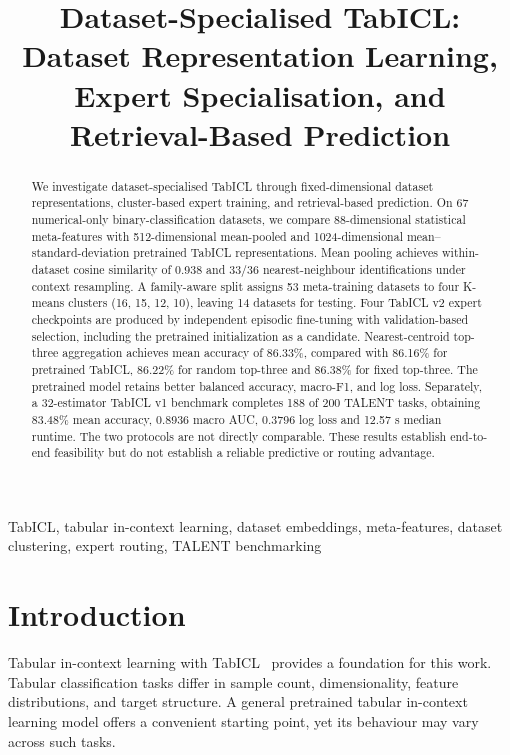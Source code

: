 \documentclass[conference]{IEEEtran}
\title{Dataset-Specialised TabICL: Dataset Representation Learning, Expert Specialisation, and Retrieval-Based Prediction}
\author{
\IEEEauthorblockN{
Ayinala Sri Nikesh (240041005)\\
Geddada Mahidhar (240041017)\\
Kesavarapu Deepak Reddy (240041022)
}
\IEEEauthorblockA{
MA 305 -- Data Science Project\\
End Evaluation -- Team 7\\
\url{https://github.com/Mahidhar21/Dataset-Specialised-TabICL}
}
}
\begin{document}
\maketitle

\begin{abstract}
We investigate dataset-specialised TabICL through fixed-dimensional dataset representations, cluster-based expert training, and retrieval-based prediction. On 67 numerical-only binary-classification datasets, we compare 88-dimensional statistical meta-features with 512-dimensional mean-pooled and 1024-dimensional mean--standard-deviation pretrained TabICL representations. Mean pooling achieves within-dataset cosine similarity of 0.938 and 33/36 nearest-neighbour identifications under context resampling. A family-aware split assigns 53 meta-training datasets to four K-means clusters (16, 15, 12, 10), leaving 14 datasets for testing. Four TabICL v2 expert checkpoints are produced by independent episodic fine-tuning with validation-based selection, including the pretrained initialization as a candidate. Nearest-centroid top-three aggregation achieves mean accuracy of 86.33\%, compared with 86.16\% for pretrained TabICL, 86.22\% for random top-three and 86.38\% for fixed top-three. The pretrained model retains better balanced accuracy, macro-F1, and log loss. Separately, a 32-estimator TabICL v1 benchmark completes 188 of 200 TALENT tasks, obtaining 83.48\% mean accuracy, 0.8936 macro AUC, 0.3796 log loss and 12.57 s median runtime. The two protocols are not directly comparable. These results establish end-to-end feasibility but do not establish a reliable predictive or routing advantage.
\end{abstract}

\begin{IEEEkeywords}
TabICL, tabular in-context learning, dataset embeddings, meta-features, dataset clustering, expert routing, TALENT benchmarking
\end{IEEEkeywords}

\section{Introduction}

Tabular in-context learning with TabICL~\cite{tabicl} provides a foundation for this work. Tabular classification tasks differ in sample count, dimensionality, feature distributions, and target structure. A general pretrained tabular in-context learning model offers a convenient starting point, yet its behaviour may vary across such tasks.
\end{document}
